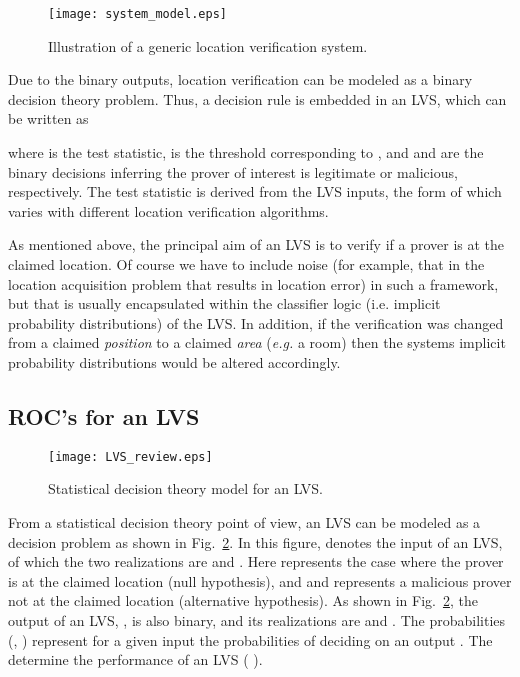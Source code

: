 \documentclass[journal]{IEEEtran}
\begin{document}
\begin{figure}[!t]
\begin{center}
{\texttt{[image: system\_model.eps]}}
\end{center}
\caption{Illustration of a generic location verification system.}
\label{fig:LVS}
\end{figure}


Due to the binary outputs, location verification can be modeled as a binary decision theory problem. Thus, a decision rule is embedded in an LVS, which can be written as

where  is the test statistic,  is the threshold corresponding to , and  and  are the binary decisions inferring the prover of interest is legitimate or malicious, respectively. The test statistic  is derived from the LVS inputs, the form of which varies with different location verification algorithms.


 As mentioned above, the principal aim of an LVS is to verify if a prover is at the claimed location. Of course we have to  include noise (for example, that in the location acquisition problem that results in location error) in such a framework, but that is usually encapsulated within the classifier logic (i.e. implicit probability distributions) of the LVS. In addition, if the verification was changed from a  claimed \emph{position} to a claimed \emph{area} (\emph{e.g.} a room) then the systems implicit probability distributions would be altered accordingly.



\subsection{ROC's for an LVS}\label{LVS_criteria}

\begin{figure}[!t]
\begin{center}
{\texttt{[image: LVS\_review.eps]}}
\end{center}
\caption{Statistical decision theory model for an LVS\cite{yan2012optimal}.}
\label{fig:LVS_high}
\end{figure}


From a statistical decision theory point of view, an LVS can be modeled as a decision problem as shown in Fig.~\ref{fig:LVS_high}. In this figure,  denotes the input of an LVS, of which the two realizations are  and . Here  represents the case where the prover is at the claimed location (null hypothesis), and
and  represents a malicious prover not at the claimed location (alternative hypothesis). As shown in Fig.~\ref{fig:LVS_high}, the output of an LVS, , is also binary, and its realizations are  and . The probabilities   (, ) represent for a given input  the probabilities of deciding on an output .  The    determine the performance of an LVS ( \cite{yan2012optimal}).
\end{document}
